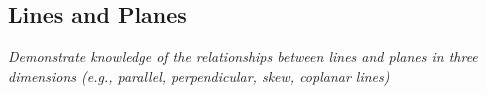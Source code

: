 \subsection[lines and planes]{Lines and Planes}

\textit{Demonstrate knowledge of the relationships between lines and planes in three dimensions
(e.g., parallel, perpendicular, skew, coplanar lines)}

